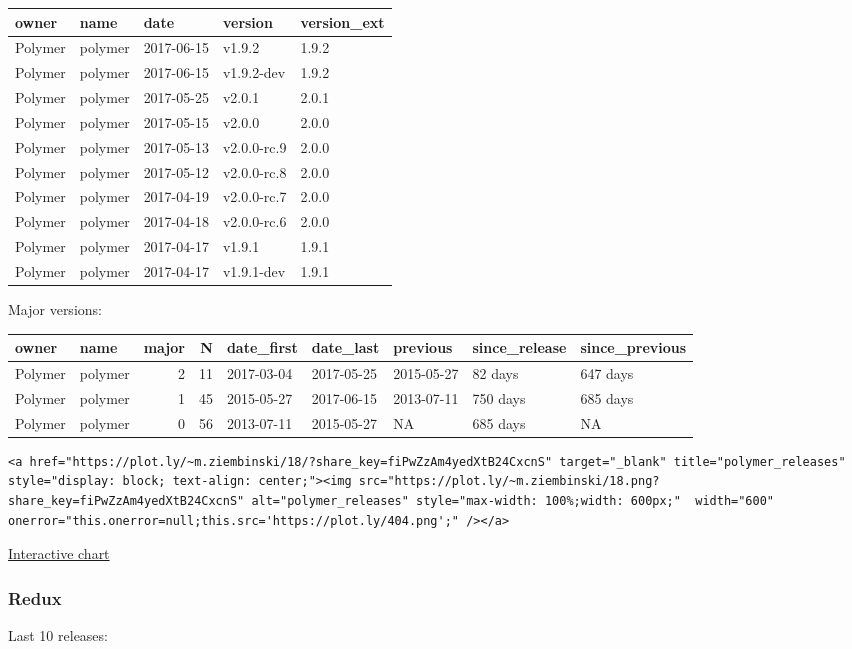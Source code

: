 \begin{longtable}[]{@{}lllll@{}}
\toprule
owner & name & date & version & version\_ext\tabularnewline
\midrule
\endhead
Polymer & polymer & 2017-06-15 & v1.9.2 & 1.9.2\tabularnewline
Polymer & polymer & 2017-06-15 & v1.9.2-dev & 1.9.2\tabularnewline
Polymer & polymer & 2017-05-25 & v2.0.1 & 2.0.1\tabularnewline
Polymer & polymer & 2017-05-15 & v2.0.0 & 2.0.0\tabularnewline
Polymer & polymer & 2017-05-13 & v2.0.0-rc.9 & 2.0.0\tabularnewline
Polymer & polymer & 2017-05-12 & v2.0.0-rc.8 & 2.0.0\tabularnewline
Polymer & polymer & 2017-04-19 & v2.0.0-rc.7 & 2.0.0\tabularnewline
Polymer & polymer & 2017-04-18 & v2.0.0-rc.6 & 2.0.0\tabularnewline
Polymer & polymer & 2017-04-17 & v1.9.1 & 1.9.1\tabularnewline
Polymer & polymer & 2017-04-17 & v1.9.1-dev & 1.9.1\tabularnewline
\bottomrule
\end{longtable}

Major versions:

\begin{longtable}[]{@{}llrrlllll@{}}
\toprule
owner & name & major & N & date\_first & date\_last & previous &
since\_release & since\_previous\tabularnewline
\midrule
\endhead
Polymer & polymer & 2 & 11 & 2017-03-04 & 2017-05-25 & 2015-05-27 & 82
days & 647 days\tabularnewline
Polymer & polymer & 1 & 45 & 2015-05-27 & 2017-06-15 & 2013-07-11 & 750
days & 685 days\tabularnewline
Polymer & polymer & 0 & 56 & 2013-07-11 & 2015-05-27 & NA & 685 days &
NA\tabularnewline
\bottomrule
\end{longtable}

\begin{verbatim}
<a href="https://plot.ly/~m.ziembinski/18/?share_key=fiPwZzAm4yedXtB24CxcnS" target="_blank" title="polymer_releases" style="display: block; text-align: center;"><img src="https://plot.ly/~m.ziembinski/18.png?share_key=fiPwZzAm4yedXtB24CxcnS" alt="polymer_releases" style="max-width: 100%;width: 600px;"  width="600" onerror="this.onerror=null;this.src='https://plot.ly/404.png';" /></a>
\end{verbatim}

\href{https://plot.ly/~m.ziembinski/18/}{Interactive chart}

\subsubsection{Redux}\label{redux}

Last 10 releases:

